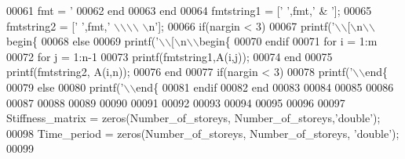 \begin{DoxyCode}
{{{{00061 \textcolor{stringliteral}{      fmt  = '}%
00062 \textcolor{stringliteral}{    end}
00063 \textcolor{stringliteral}{  end}
00064 \textcolor{stringliteral}{  fmtstring1 = ['} \textcolor{stringliteral}{',fmt,'} & \textcolor{stringliteral}{'];}
00065 \textcolor{stringliteral}{  fmtstring2 = ['} \textcolor{stringliteral}{',fmt,'} \(\backslash\)\(\backslash\)\(\backslash\)\(\backslash\) \(\backslash\)n\textcolor{stringliteral}{'];}
00066 \textcolor{stringliteral}{  if(nargin < 3)}
00067 \textcolor{stringliteral}{    printf('}\(\backslash\)\(\backslash\)[\(\backslash\)n\(\backslash\)\(\backslash\)begin\{%
00068   else
00069     printf('\(\backslash\)\(\backslash\)[\(\backslash\)n\(\backslash\)\(\backslash\)begin\{%
00070   endif  
00071   for i = 1:m
00072     for j = 1:n-1
00073        printf(fmtstring1,A(i,j));
00074     end
00075     printf(fmtstring2, A(i,n));
00076   end
00077   if(nargin < 3)
00078     printf('\(\backslash\)\(\backslash\)end\{%
00079   else
00080     printf('\(\backslash\)\(\backslash\)end\{%
00081 \textcolor{stringliteral}{  endif  }
00082 \textcolor{stringliteral}{end}
00083 \textcolor{stringliteral}{}
00084 \textcolor{stringliteral}{%
00085 \textcolor{stringliteral}{}
00086 \textcolor{stringliteral}{%
00087 \textcolor{stringliteral}{%
00088 \textcolor{stringliteral}{%
00089 \textcolor{stringliteral}{%
00090 \textcolor{stringliteral}{%
00091 \textcolor{stringliteral}{%
00092 \textcolor{stringliteral}{%
00093 \textcolor{stringliteral}{%
00094 \textcolor{stringliteral}{%
00095 \textcolor{stringliteral}{}
00096 \textcolor{stringliteral}{%
00097 \textcolor{stringliteral}{Stiffness\_matrix = zeros(Number\_of\_storeys, Number\_of\_storeys,'}\textcolor{keywordtype}{double}\textcolor{stringliteral}{');}
00098 \textcolor{stringliteral}{Time\_period = zeros(Number\_of\_storeys, Number\_of\_storeys, '}\textcolor{keywordtype}{double}\textcolor{stringliteral}{');}
00099 \textcolor{stringliteral}{}
}}}}}}}}}}}}}}}
\end{DoxyCode}
